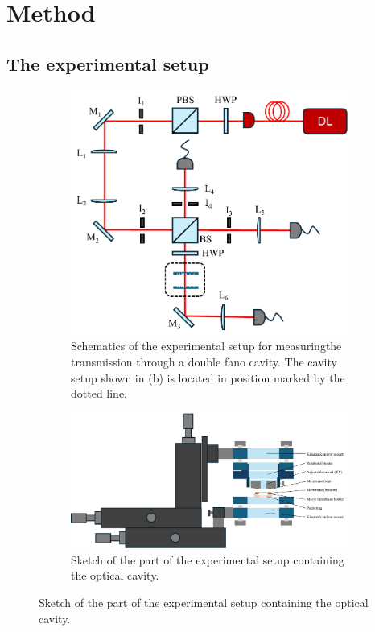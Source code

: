 \section{Method}
\subsection{The experimental setup}

\begin{figure}
    \centering
    \begin{subfigure}[b]{0.4\textwidth}
        \includegraphics[width=\textwidth]{figures/setup_sketch.pdf}
        \caption{Schematics of the experimental setup for measuringthe transmission through a double fano cavity. The cavity setup shown in (b) is located in position marked by the dotted line.}
    \end{subfigure}
    \hfill
    \begin{subfigure}[b]{0.59\textwidth}
        \includegraphics[width=\textwidth]{figures/setup_skecth_zoomed.pdf}
        \caption{Sketch of the part of the experimental setup containing the optical cavity.}
    \end{subfigure}
\end{figure}

